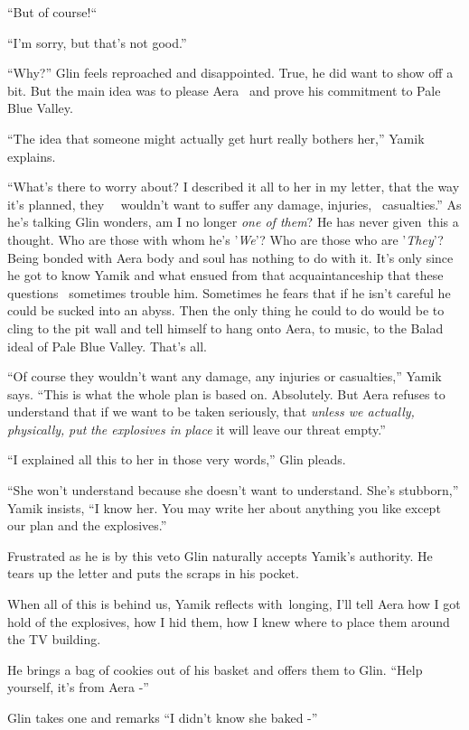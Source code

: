 \documentclass[twoside,11pt]{book}
\begin{document}
``But of course!``~

``I'm sorry, but that's not good.''

``Why?'' Glin feels reproached and disappointed. True, he did want to show off a bit. But the
main idea was to please Aera \ and prove his commitment to Pale Blue Valley.

``The idea that someone might actually get hurt really bothers her,'' Yamik explains.

``What's there to worry about? I described it all to her in my letter, that the way it's planned, they
\ \ wouldn't want to suffer any damage, injuries, \ casualties.'' As he's talking Glin wonders, am I no
longer \textit{one of them}?{ }He has never given~this a thought. Who are those
with whom he's '\textit{We}{}'? Who are those who are '\textit{They}{}'? Being bonded with Aera body and soul has
nothing to do with it. It's only since he got to know Yamik and what ensued from that acquaintanceship that these
questions \ sometimes trouble him. Sometimes he fears that if he isn't careful he could be sucked into an abyss. Then
the only thing he could to do would be to cling to the pit wall and tell himself to hang onto Aera, to music, to the
Balad ideal of Pale Blue Valley. That's all.

``Of course they wouldn't want any damage, any injuries or casualties,'' Yamik says.
``This is what the whole plan is based on. Absolutely. But Aera refuses to understand that if we want to
be taken seriously, that \textit{unless we actually, physically,} \textit{put} \textit{the explosives in} \textit{place
}it will leave our threat empty.''

``I explained all this to her in those very words,'' Glin pleads.

``She won't understand because she doesn't want to understand. She's stubborn,'' Yamik insists, ``I know
her. You may write her about anything you like except our plan and the explosives.''

Frustrated as he is by this veto Glin naturally accepts Yamik's authority. He tears up the letter and puts the scraps in
his pocket.

When all of this is behind us, Yamik reflects with~longing, I'll tell Aera how I got hold of the explosives, how I hid
them, how I knew where to place them around the TV building.

He brings a bag of cookies out of his basket and offers them to Glin. ``Help yourself, it's from Aera
-''

Glin takes one and remarks ``I didn't know she baked -''
\end{document}

